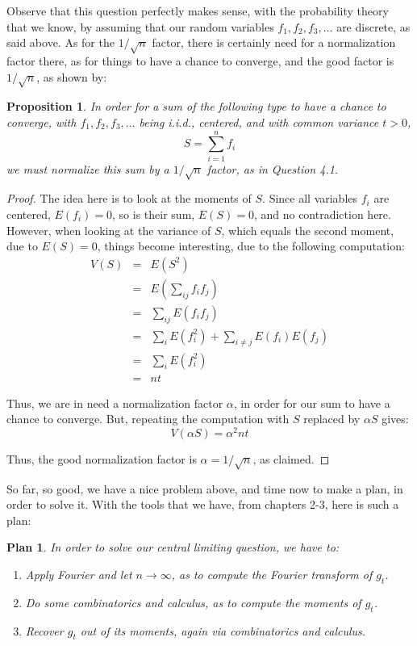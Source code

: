 \documentclass[12pt]{amsbook}
\newtheorem{plan}[theorem]{Plan}
\newtheorem{proposition}[theorem]{Proposition}
\begin{document}
Observe that this question perfectly makes sense, with the probability theory that we know, by assuming that our random variables $f_1,f_2,f_3,\ldots$ are discrete, as said above. As for the $1/\sqrt{n}$ factor, there is certainly need for a normalization factor there, as for things to have a chance to converge, and the good factor is $1/\sqrt{n}$, as shown by:

\begin{proposition}
In order for a sum of the following type to have a chance to converge, with $f_1,f_2,f_3,\ldots$ being i.i.d., centered, and with common variance $t>0$,
$$S=\sum_{i=1}^nf_i$$
we must normalize this sum by a $1/\sqrt{n}$ factor, as in Question 4.1.
\end{proposition}

\begin{proof}
The idea here is to look at the moments of $S$. Since all variables $f_i$ are centered, $E(f_i)=0$, so is their sum, $E(S)=0$, and no contradiction here. However, when looking at the variance of $S$, which equals the second moment, due to $E(S)=0$, things become interesting, due to the following computation:
\begin{eqnarray*}
V(S)
&=&E(S^2)\\
&=&E\left(\sum_{ij}f_if_j\right)\\
&=&\sum_{ij}E(f_if_j)\\
&=&\sum_iE(f_i^2)+\sum_{i\neq j}E(f_i)E(f_j)\\
&=&\sum_iE(f_i^2)\\
&=&nt
\end{eqnarray*}

Thus, we are in need a normalization factor $\alpha$, in order for our sum to have a chance to converge. But, repeating the computation with $S$ replaced by $\alpha S$ gives:
$$V(\alpha S)=\alpha^2nt$$

Thus, the good normalization factor is $\alpha=1/\sqrt{n}$, as claimed.
\end{proof}

So far, so good, we have a nice problem above, and time now to make a plan, in order to solve it. With the tools that we have, from chapters 2-3, here is such a plan:

\begin{plan}
In order to solve our central limiting question, we have to:
\begin{enumerate}
\item Apply Fourier and let $n\to\infty$, as to compute the Fourier transform of $g_t$.

\item Do some combinatorics and calculus, as to compute the moments of $g_t$.

\item Recover $g_t$ out of its moments, again via combinatorics and calculus.
\end{enumerate}
\end{plan}
\end{document}
